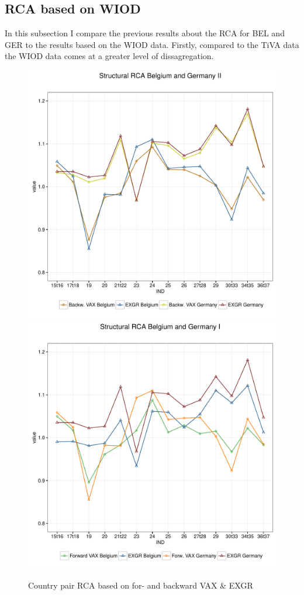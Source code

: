 \subsection{RCA based on WIOD}
In this subsection I compare the previous results about the RCA for BEL and GER to the results based on the WIOD data.
Firstly, compared to the TiVA data the WIOD data comes at a greater level of dissagregation.
\begin{figure}
\caption{Country pair RCA based on for- and backward  VAX \& EXGR }
\includegraphics[width=.5\linewidth]{./fig/back_exgr_DEU_BEL_wiod.pdf}
\includegraphics[width=.5\linewidth]{./fig/forw_exgr_DEU_BEL_wiod.pdf}
\end{figure}
\endinput
